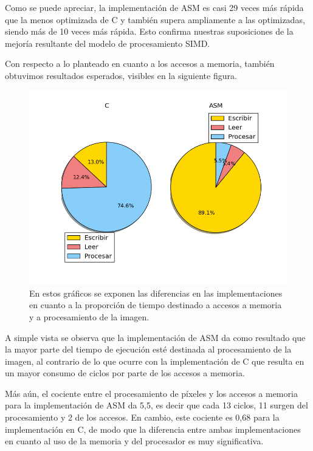 \par{Como se puede apreciar, la implementación de ASM es casi 29 veces más rápida que la menos optimizada de C y también supera ampliamente a las optimizadas, siendo más de 10 veces más rápida. Esto confirma nuestras suposiciones de la mejoría resultante del modelo de procesamiento SIMD.}

\medskip

\par{Con respecto a lo planteado en cuanto a los accesos a memoria, también obtuvimos resultados esperados, visibles en la siguiente figura.}

\begin{figure}[h!]
\centering
\captionsetup{justification=centering}
	\includegraphics[width = 12 cm, height = 8 cm]{imagenes/CombinarMemoria.png}
\caption[center]{En estos gráficos se exponen las diferencias en las implementaciones en cuanto a la proporción de tiempo destinado a accesos a memoria y a procesamiento de la imagen.}
\end{figure}

\par{A simple vista se observa que la implementación de ASM da como resultado que la mayor parte del tiempo de ejecución esté destinada al procesamiento de la imagen, al contrario de lo que ocurre con la implementación de C que resulta en un mayor consumo de ciclos por parte de los accesos a memoria.}
\par{Más aún, el cociente entre el procesamiento de píxeles y los accesos a memoria para la implementación de ASM da 5,5, es decir que cada 13 ciclos, 11 surgen del procesamiento y 2 de los accesos. En cambio, este cociente es 0,68 para la implementación en C, de modo que la diferencia entre ambas implementaciones en cuanto al uso de la memoria y del procesador es muy significativa.}